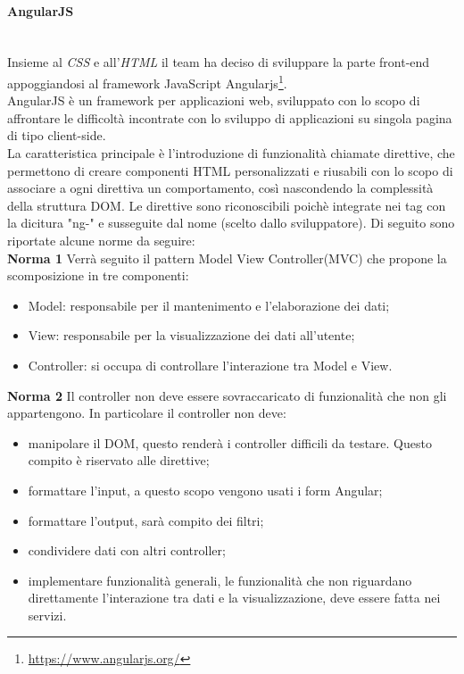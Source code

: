 \paragraph{AngularJS} \label{angularjs} \-\\
Insieme al \textit{CSS} e all'\textit{HTML} il team ha deciso di sviluppare la parte front-end appoggiandosi al framework JavaScript Angularjs\footnote{\url{https://www.angularjs.org/}}\glossario.\\
AngularJS è un framework per applicazioni web, sviluppato con lo scopo di affrontare le difficoltà incontrate con lo sviluppo di applicazioni su singola pagina di tipo client-side. \-\\
La caratteristica principale è l'introduzione di funzionalità chiamate direttive, che permettono di creare componenti HTML personalizzati e riusabili con lo scopo di associare a ogni direttiva un comportamento, così nascondendo la complessità della struttura DOM. Le direttive sono riconoscibili poichè integrate nei tag con la dicitura "ng-" e susseguite dal nome (scelto dallo sviluppatore). 
Di seguito sono riportate alcune norme da seguire:\\
\textbf{Norma 1}
Verrà seguito il pattern Model View Controller(MVC) che propone la scomposizione in tre componenti:
\begin{itemize}
	\item Model: responsabile per il mantenimento e l'elaborazione dei dati;
	\item View: responsabile per la visualizzazione dei dati all'utente;
	\item Controller: si occupa di controllare l'interazione tra Model e View.
\end{itemize} 
\textbf{Norma 2}
Il controller non deve essere sovraccaricato di funzionalità che non gli appartengono. In particolare il controller non deve:
\begin{itemize}
	\item manipolare il DOM\glossario, questo renderà i controller difficili da testare. Questo compito è riservato alle direttive;
	\item formattare l'input, a questo scopo vengono usati i form Angular;
	\item formattare l'output, sarà compito dei filtri;
	\item condividere dati con altri controller;
	\item implementare funzionalità generali, le funzionalità che non riguardano direttamente l'interazione tra dati e la visualizzazione, deve essere fatta nei servizi.
\end{itemize}
